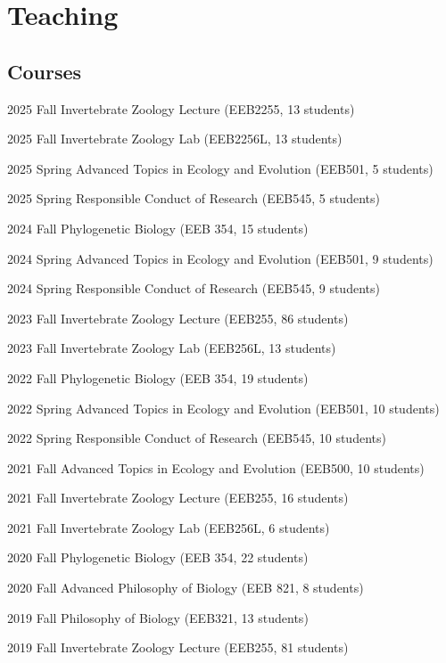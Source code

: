 \section{Teaching}

\subsection*{Courses}

\begin{entry}{60pt}
\item [\rm 2025 Fall] Invertebrate Zoology Lecture (EEB2255, 13 students)
\item [\rm 2025 Fall] Invertebrate Zoology Lab (EEB2256L, 13 students)
\item [\rm 2025 Spring] Advanced Topics in Ecology and Evolution (EEB501, 5 students)
\item [\rm 2025 Spring] Responsible Conduct of Research (EEB545, 5 students)
\item [\rm 2024 Fall] Phylogenetic Biology (EEB 354, 15 students)
\item [\rm 2024 Spring] Advanced Topics in Ecology and Evolution (EEB501, 9 students)
\item [\rm 2024 Spring] Responsible Conduct of Research (EEB545, 9 students)
\item [\rm 2023 Fall] Invertebrate Zoology Lecture (EEB255, 86 students)
\item [\rm 2023 Fall] Invertebrate Zoology Lab (EEB256L, 13 students)
\item [\rm 2022 Fall] Phylogenetic Biology (EEB 354, 19 students)
\item [\rm 2022 Spring] Advanced Topics in Ecology and Evolution (EEB501, 10 students)
\item [\rm 2022 Spring] Responsible Conduct of Research (EEB545, 10 students)
\item [\rm 2021 Fall] Advanced Topics in Ecology and Evolution (EEB500, 10 students)
\item [\rm 2021 Fall] Invertebrate Zoology Lecture (EEB255, 16 students)
\item [\rm 2021 Fall] Invertebrate Zoology Lab (EEB256L, 6 students)
\item [\rm 2020 Fall] Phylogenetic Biology (EEB 354, 22 students)
\item [\rm 2020 Fall] Advanced Philosophy of Biology (EEB 821, 8 students)
\item [\rm 2019 Fall] Philosophy of Biology (EEB321, 13 students)
\item [\rm 2019 Fall] Invertebrate Zoology Lecture (EEB255, 81 students)

\end{entry}
